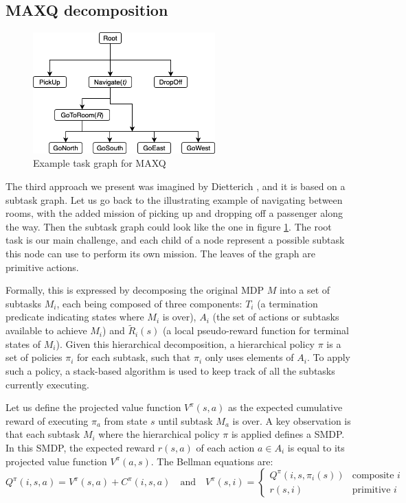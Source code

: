 \documentclass{article}
\begin{document}
\subsection{MAXQ decomposition}

\begin{figure}
\includegraphics[width=7cm]{images/MAXQ.png}
\caption{Example task graph for MAXQ}
\label{fig:MAXQ}
\end{figure}

The third approach we present was imagined by Dietterich \cite{dietterich_hierarchical_2000}, and it is based on a subtask graph. Let us go back to the illustrating example of navigating between rooms, with the added mission of picking up and dropping off a passenger along the way. Then the subtask graph could look like the one in figure \ref{fig:MAXQ}. The root task is our main challenge, and each child of a node represent a possible subtask this node can use to perform its own mission. The leaves of the graph are primitive actions.

Formally, this is expressed by decomposing the original MDP $M$ into a set of subtasks $M_i$, each being composed of three components: $T_i$ (a termination predicate indicating states where $M_i$ is over), 
$A_i$ (the set of actions or subtasks available to achieve $M_i$) and
$\tilde{R}_i(s)$ (a local pseudo-reward function for terminal states of $M_i$). Given this hierarchical decomposition, a hierarchical policy $\pi$ is a set of policies $\pi_i$ for each subtask, such that $\pi_i$ only uses elements of $A_i$. To apply such a policy, a stack-based algorithm is used to keep track of all the subtasks currently executing.

Let us define the projected value function $V^{\pi}(s, a)$ as the expected cumulative reward of executing $\pi_a$ from state $s$ until subtask $M_a$ is over. A key observation is that each subtask $M_i$ where the hierarchical policy $\pi$ is applied defines a SMDP. In this SMDP, the expected reward $r(s, a)$ of each action $a \in A_i$ is equal to its projected value function $V^{\pi}(a, s)$. The Bellman equations are:
\begin{equation}
    Q^{\pi}(i, s, a) = V^{\pi}(s, a) + C^{\pi}(i, s, a) \quad \text{and} \quad V^{\pi}(s, i) = \begin{cases} Q^{\pi}(i, s, \pi_i(s)) & \text{composite $i$} \\ r(s, i) & \text{primitive $i$} \end{cases}
\end{equation}
\end{document}
